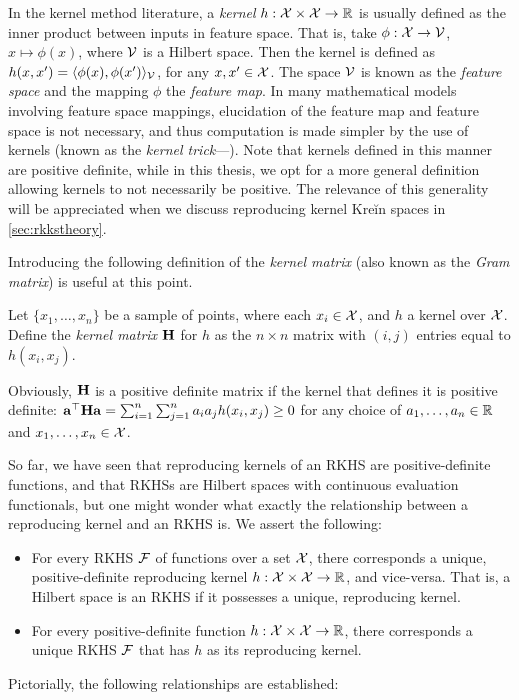 \begin{remark}\label{rem:kernel}
  In the kernel method literature, a \emph{kernel} $h:{\mathcal X}\times{\mathcal X}\to\mathbb{R}$ is usually defined as the inner product between inputs in feature space.
  That is, take $\phi:{\mathcal X}\to{\mathcal V}$, $x\mapsto\phi(x)$, where ${\mathcal V}$ is a Hilbert space.
  Then the kernel is defined as $h(x,x') = \langle\phi(x),\phi(x')\rangle_{\mathcal V}$, for any $x,x'\in{\mathcal X}$.
  The space ${\mathcal V}$ is known as the \emph{feature space} and the mapping $\phi$ the \emph{feature map}.
  In many mathematical models involving feature space mappings, elucidation of the feature map and feature space is not necessary, and thus computation  is made simpler by the use of kernels (known as the \emph{kernel trick}---\cite{hofmann2008kernel}).
  Note that kernels defined in this manner are positive definite, while in this thesis, we opt for a more general definition allowing kernels to not necessarily be positive.
  The relevance of this generality will be appreciated when we discuss reproducing kernel Kreĭn spaces in \cref{sec:rkkstheory}.
\end{remark}

\vspace{-0.8em}
Introducing the following definition of the \emph{kernel matrix} (also known as the \emph{Gram matrix}) is useful at this point.
\begin{definition}
  Let $\{x_1,\dots,x_n\}$ be a sample of points, where each $x_i\in{\mathcal X}$, and $h$ a kernel over ${\mathcal X}$.
  Define the \emph{kernel matrix} ${\mathbf H}$ for $h$ as the $n \times n$ matrix with $(i,j)$ entries equal to $h(x_i,x_j)$.
\end{definition}
Obviously, ${\mathbf H}$ is a positive definite matrix if the kernel that defines it is positive definite: ${\mathbf a}^\top{\mathbf H}{\mathbf a} = \sum_{i=1}^n\sum_{j=1}^n a_ia_jh(x_i,x_j) \geq 0$ for any choice of $a_1,\dots,a_n\in\mathbb{R}$ and $x_1,\dots,x_n\in{\mathcal X}$.

So far, we have seen that reproducing kernels of an RKHS are positive-definite functions, and that RKHSs are Hilbert spaces with continuous evaluation functionals, but one might wonder what exactly the relationship between a reproducing kernel and an RKHS is.
We assert the following:
\begin{itemize}
  \item For every RKHS ${\mathcal F}$ of functions over a set ${\mathcal X}$, there corresponds a unique, positive-definite reproducing kernel $h:{\mathcal X}\times{\mathcal X}\to\mathbb{R}$, and vice-versa. That is, a Hilbert space is an RKHS if it possesses a unique, reproducing kernel.
  \item For every positive-definite function $h:{\mathcal X}\times{\mathcal X}\to\mathbb{R}$, there corresponds a unique RKHS ${\mathcal F}$ that has $h$ as its reproducing kernel.
\end{itemize}
Pictorially, the following relationships are established:

